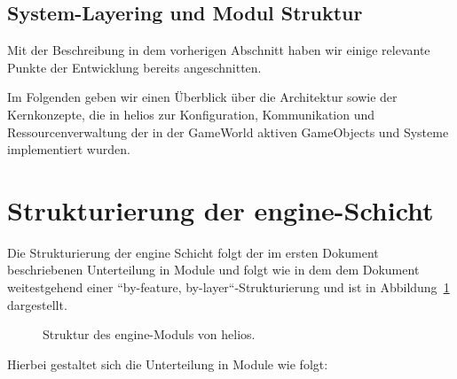 \subsection{System-Layering und Modul Struktur}

Mit der Beschreibung in dem vorherigen Abschnitt haben wir einige relevante Punkte der Entwicklung bereits angeschnitten.

Im Folgenden geben wir einen Überblick über die Architektur sowie der Kernkonzepte, die in helios zur Konfiguration, Kommunikation und Ressourcenverwaltung der in der GameWorld aktiven GameObjects und Systeme implementiert wurden.

\section{Strukturierung der engine-Schicht}

Die Strukturierung der engine Schicht folgt der im ersten Dokument beschriebenen Unterteilung in Module und folgt wie in dem dem Dokument weitestgehend einer ``by-feature, by-layer``-Strukturierung und ist in Abbildung~\ref{fig:engine_struktur} dargestellt.

\begin{figure}[htbp]
    \setlength{\DTbaselineskip}{18pt}
    \caption{Struktur des engine-Moduls von helios.}
    \label{fig:engine_struktur}
\end{figure}

Hierbei gestaltet sich die Unterteilung in Module wie folgt:

